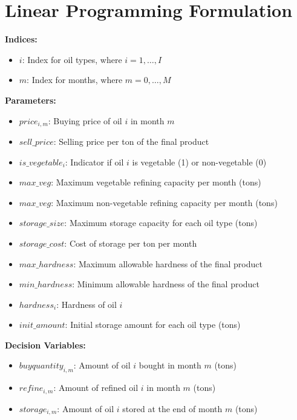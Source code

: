 \documentclass{article}
\begin{document}
\section*{Linear Programming Formulation}

\textbf{Indices:}
\begin{itemize}
    \item \( i \): Index for oil types, where \( i = 1, \ldots, I \)
    \item \( m \): Index for months, where \( m = 0, \ldots, M \)
\end{itemize}

\textbf{Parameters:}
\begin{itemize}
    \item \( price_{i,m} \): Buying price of oil \( i \) in month \( m \)
    \item \( sell\_price \): Selling price per ton of the final product
    \item \( is\_vegetable_{i} \): Indicator if oil \( i \) is vegetable (1) or non-vegetable (0)
    \item \( max\_veg \): Maximum vegetable refining capacity per month (tons)
    \item \( max\_veg \): Maximum non-vegetable refining capacity per month (tons)
    \item \( storage\_size \): Maximum storage capacity for each oil type (tons)
    \item \( storage\_cost \): Cost of storage per ton per month
    \item \( max\_hardness \): Maximum allowable hardness of the final product
    \item \( min\_hardness \): Minimum allowable hardness of the final product
    \item \( hardness_{i} \): Hardness of oil \( i \)
    \item \( init\_amount \): Initial storage amount for each oil type (tons)
\end{itemize}

\textbf{Decision Variables:}
\begin{itemize}
    \item \( buyquantity_{i,m} \): Amount of oil \( i \) bought in month \( m \) (tons)
    \item \( refine_{i,m} \): Amount of refined oil \( i \) in month \( m \) (tons)
    \item \( storage_{i,m} \): Amount of oil \( i \) stored at the end of month \( m \) (tons)
\end{itemize}
\end{document}

